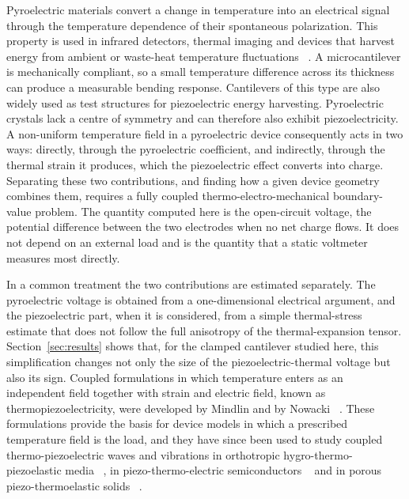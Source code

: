 \documentclass[pdflatex,sn-mathphys-num]{sn-jnl}
\begin{document}
Pyroelectric materials convert a change in temperature into an electrical signal
through the temperature dependence of their spontaneous polarization. This property is
used in infrared detectors, thermal imaging and devices that harvest energy from
ambient or waste-heat temperature fluctuations ~\cite{Lang2005Pyro,Whatmore1986,Lubomirsky2012}.
A microcantilever is mechanically compliant, so a small temperature difference
across its thickness can produce a measurable bending response. Cantilevers of this
type are also widely used as test structures for piezoelectric energy harvesting. Pyroelectric crystals lack a centre of symmetry and can therefore also exhibit
piezoelectricity. A non-uniform temperature field in a pyroelectric device consequently
acts in two ways: directly, through the pyroelectric coefficient, and indirectly,
through the thermal strain it produces, which the piezoelectric effect converts into
charge. Separating these two
contributions, and finding how a given device geometry combines them, requires a fully
coupled thermo-electro-mechanical boundary-value problem. The quantity computed here is
the open-circuit voltage, the potential difference between the two electrodes when no
net charge flows. It does not depend on an external load and is the quantity that a
static voltmeter measures most directly.

In a common treatment the two contributions are estimated separately. The pyroelectric
voltage is obtained from a one-dimensional electrical argument, and the piezoelectric
part, when it is considered, from a simple thermal-stress estimate that does not follow
the full anisotropy of the thermal-expansion tensor. Section~\ref{sec:results} shows
that, for the clamped cantilever studied here, this simplification changes not only the
size of the piezoelectric-thermal voltage but also its sign. Coupled formulations in
which temperature enters as an independent field together with strain and electric
field, known as thermopiezoelectricity, were developed by Mindlin and by Nowacki
~\cite{Mindlin1972,Nowacki1975}. These formulations provide the basis for device models
in which a prescribed temperature field is the load, and they have since been used to
study coupled thermo-piezoelectric waves and vibrations in orthotropic
hygro-thermo-piezoelastic media ~\cite{Gupta2024JNMP}, in piezo-thermo-electric
semiconductors ~\cite{Gupta2024WRCM,Gupta2025HFF} and in porous piezo-thermoelastic
solids ~\cite{Das2026KG}.
\end{document}
